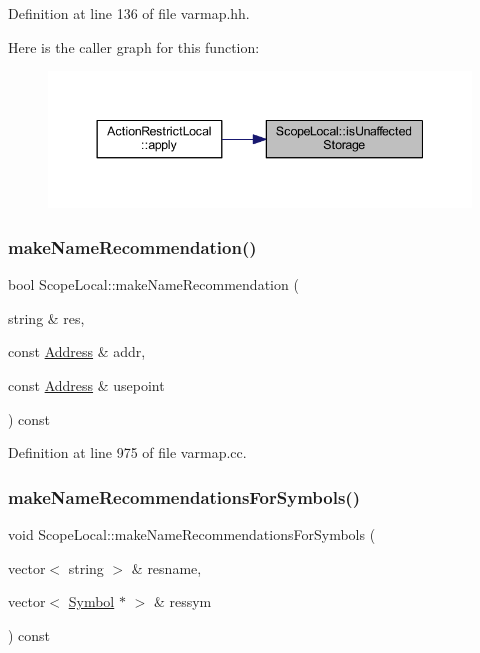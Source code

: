 Definition at line 136 of file varmap.\+hh.

Here is the caller graph for this function\+:
\nopagebreak
\begin{figure}[H]
\begin{center}
\leavevmode
\includegraphics[width=344pt]{class_scope_local_ac6913e22130acb08f7d075a136c36780_icgraph}
\end{center}
\end{figure}
\mbox{\label{class_scope_local_aff7d78a874e28f4798f6979d7f2edc50}} 
\subsubsection{\texorpdfstring{makeNameRecommendation()}{makeNameRecommendation()}}
{\footnotesize\ttfamily bool Scope\+Local\+::make\+Name\+Recommendation (\begin{DoxyParamCaption}\item[{string \&}]{res,  }\item[{const \mbox{\hyperlink{class_address}{Address}} \&}]{addr,  }\item[{const \mbox{\hyperlink{class_address}{Address}} \&}]{usepoint }\end{DoxyParamCaption}) const}



Definition at line 975 of file varmap.\+cc.

\mbox{\label{class_scope_local_ae812b32473e4de47b9072370b75de94c}} 
\subsubsection{\texorpdfstring{makeNameRecommendationsForSymbols()}{makeNameRecommendationsForSymbols()}}
{\footnotesize\ttfamily void Scope\+Local\+::make\+Name\+Recommendations\+For\+Symbols (\begin{DoxyParamCaption}\item[{vector$<$ string $>$ \&}]{resname,  }\item[{vector$<$ \mbox{\hyperlink{class_symbol}{Symbol}} $\ast$ $>$ \&}]{ressym }\end{DoxyParamCaption}) const}



